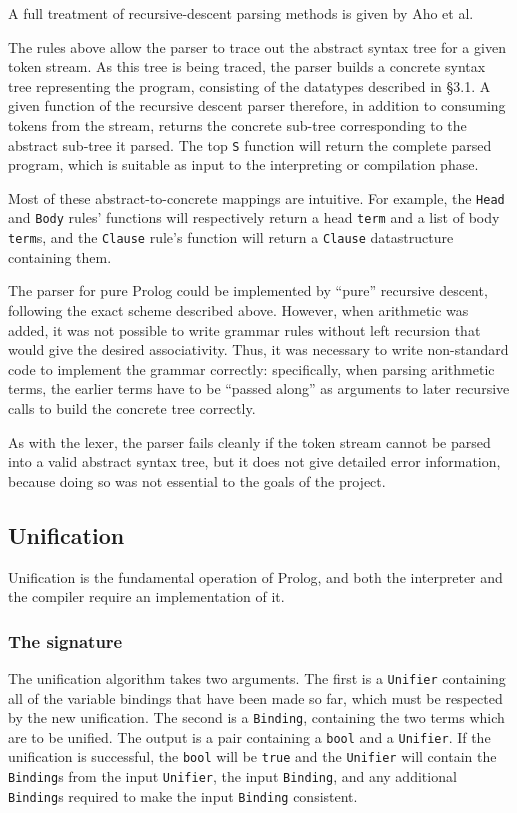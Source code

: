 \documentclass[12pt]{article}
\begin{document}
A full treatment of recursive-descent parsing methods is given by Aho et al. \cite{compiler}

The rules above allow the parser to trace out the abstract syntax tree for a given token stream.
As this tree is being traced, the parser builds a concrete syntax tree representing the program, consisting of the datatypes described in \S3.1.
A given function of the recursive descent parser therefore, in addition to consuming tokens from the stream, returns the concrete sub-tree corresponding to the abstract sub-tree it parsed.
The top \verb|S| function will return the complete parsed program, which is suitable as input to the interpreting or compilation phase.

Most of these abstract-to-concrete mappings are intuitive.
For example, the \verb|Head| and \verb|Body| rules' functions will respectively return a head \verb|term| and a list of body \verb|term|s, and the \verb|Clause| rule's function will return a \verb|Clause| datastructure containing them.

The parser for pure Prolog could be implemented by ``pure'' recursive descent, following the exact scheme described above.
However, when arithmetic was added, it was not possible to write grammar rules without left recursion that would give the desired associativity. 
Thus, it was necessary to write non-standard code to implement the grammar correctly: specifically, when parsing arithmetic terms, the earlier terms have to be ``passed along'' as arguments to later recursive calls to build the concrete tree correctly.

As with the lexer, the parser fails cleanly if the token stream cannot be parsed into a valid abstract syntax tree, but it does not give detailed error information, because doing so was not essential to the goals of the project.

\subsection{Unification}

Unification is the fundamental operation of Prolog, and both the interpreter and the compiler require an implementation of it.

\subsubsection{The signature}

The unification algorithm takes two arguments. 
The first is a \verb|Unifier| containing all of the variable bindings that have been made so far, which must be respected by the new unification. 
The second is a \verb|Binding|, containing the two terms which are to be unified. 
The output is a pair containing a \verb|bool| and a \verb|Unifier|. 
If the unification is successful, the \verb|bool| will be \verb|true| and the \verb|Unifier| will contain the \verb|Binding|s from the input \verb|Unifier|, the input \verb|Binding|, and any additional \verb|Binding|s required to make the input \verb|Binding| consistent.
\end{document}
